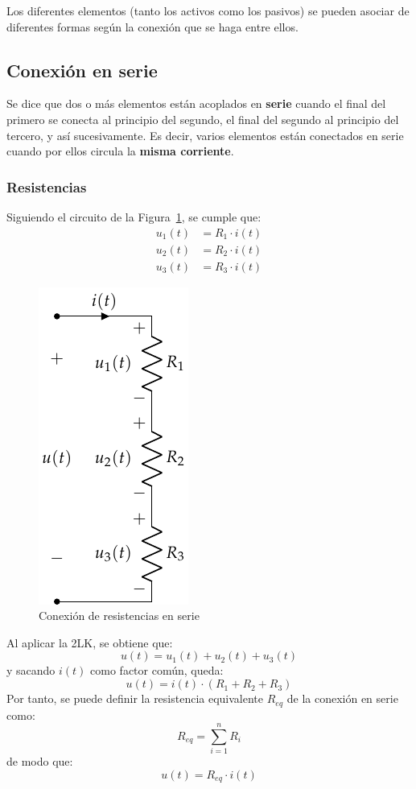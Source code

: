 	Los diferentes elementos (tanto los activos como los pasivos) se pueden asociar de diferentes formas según la conexión que se haga entre ellos. 
	
	\subsection{Conexión en serie}
	Se dice que dos o más elementos están acoplados en \textbf{serie} cuando el final del primero se conecta al principio del segundo, el final del segundo al principio del tercero, y así sucesivamente. Es decir, varios elementos están conectados en serie cuando por ellos circula la \textbf{misma corriente}. 
	
	\subsubsection{Resistencias}
	Siguiendo el circuito de la Figura~\ref{fig.serie}, se cumple que:
		\begin{align*}
			u_1(t) &= R_1 \cdot i(t)\\
			u_2(t) &= R_2 \cdot i(t)\\
			u_3(t) &= R_3 \cdot i(t)
		\end{align*}
		\begin{figure}[H]
			\centering
			\includegraphics[width=0.2\linewidth]{../figs/AsociacionSerie.pdf}
			\caption{Conexión de resistencias en serie}
			\label{fig.serie}
		\end{figure}
		Al aplicar la 2LK, se obtiene que: 
		\begin{equation*}
			u(t) = u_1(t) + u_2(t) + u_3(t)
		\end{equation*}
		y sacando $i(t)$ como factor común, queda:
		\begin{equation*}
			u(t) = i(t) \cdot (R_1 + R_2 + R_3)
		\end{equation*}
		Por tanto, se puede definir la resistencia equivalente $R_{eq}$ de la conexión en serie como:
		\begin{equation}
			\boxed{R_{eq} = \sum_{i = 1}^n R_i}
		\end{equation}
		de modo que:
		\begin{equation*}
			u(t) = R_{eq} \cdot i(t)
		\end{equation*}
		
